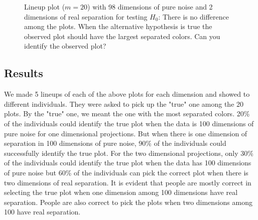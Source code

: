 \documentclass[12]{report}
\begin{document}
\begin{figure}[hbtp]
   \centering
       \caption{Lineup plot ($m=20$) with 98 dimensions of pure noise and 2 dimensions of real separation for testing $H_0$: There is no difference among the plots. When the alternative hypothesis is true the observed plot should have the largest separated colors. Can you identify the observed plot?}
       \label{not_noise}
\end{figure}


\subsection{Results}

We made 5 lineups of each of the above plots for each dimension and showed to different individuals. They were asked to pick up the "true" one among the 20 plots. By the "true" one, we meant the one with the most separated colors. 20\% of the individuals could identify the true plot when the data is 100 dimensions of pure noise for one dimensional projections. But when there is one dimension of separation in 100 dimensions of pure noise, 90\% of the individuals could successfully identify the true plot. For the two dimensional projections, only 30\% of the individuals could identify the true plot when the data has 100 dimensions of pure noise but 60\% of the individuals can pick the correct plot when there is two dimensions of real separation. It is evident that people are mostly correct in selecting the true plot when one dimension among 100 dimensions have real separation. People are also correct to pick the plots when two dimensions among 100 have real separation.
\end{document}
